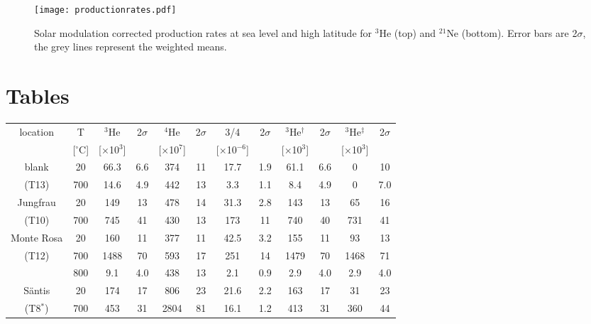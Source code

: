 \documentclass{article}
\begin{document}
\clearpage
\begin{figure}[htbp]
  \centering
  \texttt{[image: productionrates.pdf]}
  \caption{Solar modulation corrected production rates at sea level and high 
latitude for $^3$He (top) and $^{21}$Ne (bottom). Error bars are 2$\sigma$, the grey
lines represent the weighted means.}
  \label{fig:productionrates}
\end{figure}

\clearpage

\section*{Tables}

\begin{table}[htbp]
  \centering
\begin{tabular}{cccccccccccc}
  location &     T &   $^3$He &   2$\sigma$ &   $^4$He &   2$\sigma$ &    3/4 &   2$\sigma$ &  $^3$He$^{\dagger}$ &   2$\sigma$ & $^3$He$^{\ddagger}$ &   2$\sigma$ \\
           &     [$^{\circ}$C] &    [$\times$10$^3$] &     &     [$\times$10$^7$] &    &     [$\times$10$^{-6}$] &     &    [$\times$10$^3$] &    &    [$\times$10$^3$] &    \\
\hline
\hline
blank &    20 &    66.3 &     6.6 &  374 &   11 &  17.7 &   1.9 &  61.1 &   6.6 &     0 &   10 \\
(T13)           &   700 &    14.6 &     4.9 &  442 &   13 &   3.3 &   1.1 &   8.4 &   4.9 &     0 &   7.0 \\
\hline
Jungfrau &    20 &   149 &    13 &  478 &   14 &  31.3 &   2.8 & 143 &  13 &  65 &  16 \\
(T10)         &   700 &   745 &    41 &  430 &   13 & 173 &  11 & 740 &  40 & 731 &  41 \\
\hline
Monte Rosa &    20 &   160 &    11 &  377 &   11 &  42.5 &   3.2 & 155 &  11 &  93 &  13 \\
(T12)       &   700 &  1488 &    70 &  593 &   17 & 251 &  14 &     1479 &  70 &     1468 &  71 \\
           &   800 &     9.1 &     4.0 &  438 &   13 &   2.1 &   0.9 &   2.9 &   4.0 &   2.9 &   4.0 \\
\hline
S\"{a}ntis &    20 &   174 &    17 &  806 &   23 &  21.6 &   2.2 & 163 &  17 &  31 &  23 \\
(T8$^*$)           &   700 &   453 &    31 & 2804 &   81 &  16.1 &   1.2 & 413 &  31 & 360 &  44 \\

\end{tabular}
\end{table}
\end{document}

